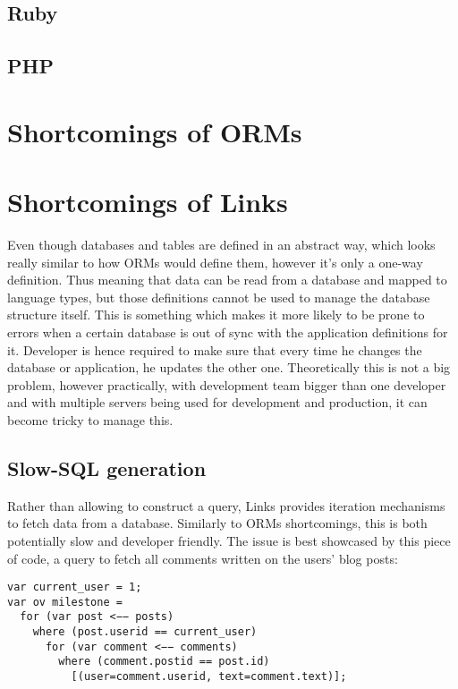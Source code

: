 \subsection{Ruby}

\subsection{PHP}

\section{Shortcomings of ORMs}

\section{Shortcomings of Links}

Even though databases and tables are defined in an abstract way, which looks really similar to how ORMs would define them, however it's only a one-way definition. Thus meaning that data can be read from a database and mapped to language types, but those definitions cannot be used to manage the database structure itself. This is something which makes it more likely to be prone to errors when a certain database is out of sync with the application definitions for it. Developer is hence required to make sure that every time he changes the database or application, he updates the other one. Theoretically this is not a big problem, however practically, with development team bigger than one developer and with multiple servers being used for development and production, it can become tricky to manage this. 

\subsection{Slow-SQL generation}

Rather than allowing to construct a query, Links provides iteration mechanisms to fetch data from a database. Similarly to ORMs shortcomings, this is both potentially slow and developer friendly. The issue is best showcased by this piece of code, a query to fetch all comments written on the users' blog posts:

\begin{codelisting}
\begin{verbatim}
var current_user = 1;
var ov milestone =
  for (var post <−− posts)
    where (post.userid == current_user)
      for (var comment <−− comments)
        where (comment.postid == post.id)
          [(user=comment.userid, text=comment.text)];
\end{verbatim}
\end{codelisting}

